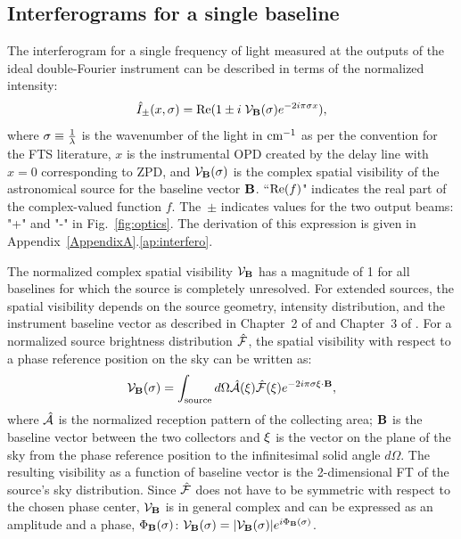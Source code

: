 \subsection{Interferograms for a single baseline}

The interferogram for a single frequency of light measured at the outputs of the ideal double-Fourier instrument can be 
described in terms of the normalized intensity:
\begin{equation}
\hat{I}_\pm(x,\sigma) = \textrm{Re}(1 \pm i \; \mathcal{V}_{\mathbf{B}}(\sigma) e^{-2i\pi \sigma x}),
\label{eq:basicinterferogram}
\end{equation}
where $\sigma \equiv {1 \over \lambda}$ is the wavenumber of the light in $\cm1$ as per the convention for the FTS literature, $x$ is the instrumental OPD created by the delay line with $x=0$ corresponding to ZPD, and $\mathcal{V}_{\mathbf{B}}(\sigma)$ is the complex spatial visibility
 of the astronomical source for the baseline vector $\mathbf{B}$. ``$\textrm{Re}(f)$" indicates the real part of the complex-valued function $f$. The~$\pm$ indicates values for the two output beams: "+" and "-" in Fig.~\ref{fig:optics}.
The derivation of this expression is given in Appendix~\ref{AppendixA}.\ref{ap:interfero}.

The normalized complex spatial visibility $\mathcal{V}_{\mathbf{B}}$ has a magnitude of 1 for all baselines for which the source is completely unresolved. For extended sources, the spatial visibility depends on the source geometry, intensity distribution, and the instrument baseline vector as described in Chapter~2 of \citep{Lawson:2000vf} 
and Chapter~3 of \cite{Thompson:2008ww}.  
For a normalized source brightness distribution $\hat{\mathcal{F}}$, the spatial visibility with respect to a phase reference position on the sky can be written as:
\begin{equation}
\mathcal{V}_{\mathbf{B}}(\sigma)  =  \int_\textrm{source} d\Omega \hat{\mathcal{A}}(\xi) \hat{\mathcal{F}}(\xi ) e^{-2i\pi\sigma\xi\cdot \mathbf{B}},
\label{eq:viseq}
\end{equation}
where $\hat{\mathcal{A}}$ is the normalized reception pattern of the collecting area; $\mathbf{B}$ is the baseline vector between the two collectors and $\xi$ is the vector on the plane of the sky from the phase reference position to the infinitesimal solid angle $d\Omega$. The resulting visibility as a function of baseline vector is the 2-dimensional FT of the source's sky distribution. 
Since $\hat{\mathcal{F}}$ does not have to be symmetric with respect to the chosen phase center, $\mathcal{V}_{\mathbf{B}}$ is in general complex and can be expressed as an amplitude and a phase, $\Phi_\mathbf{B}(\sigma)$: $\mathcal{V}_{\mathbf{B}}(\sigma)  =  |\mathcal{V}_{\mathbf{B}}(\sigma)|e^{i\Phi_\mathbf{B}(\sigma)} $.


